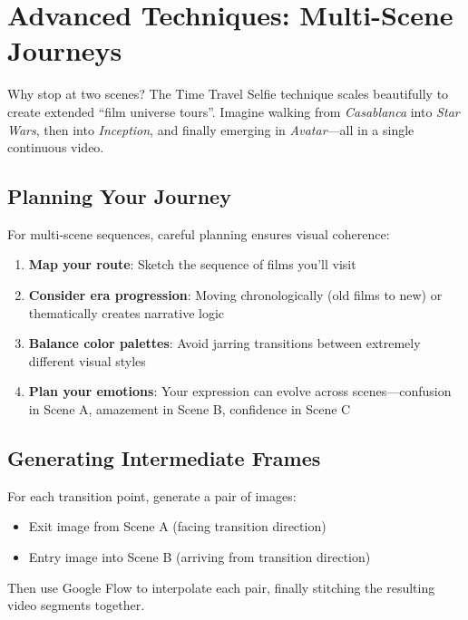 \section{Advanced Techniques: Multi-Scene Journeys}
\label{sec:multi-scene}

Why stop at two scenes? The Time Travel Selfie technique scales beautifully to create extended ``film universe tours''. Imagine walking from \textit{Casablanca} into \textit{Star Wars}, then into \textit{Inception}, and finally emerging in \textit{Avatar}—all in a single continuous video.

\subsection{Planning Your Journey}

For multi-scene sequences, careful planning ensures visual coherence:

\begin{enumerate}
\item \textbf{Map your route}: Sketch the sequence of films you'll visit
\item \textbf{Consider era progression}: Moving chronologically (old films to new) or thematically creates narrative logic
\item \textbf{Balance color palettes}: Avoid jarring transitions between extremely different visual styles
\item \textbf{Plan your emotions}: Your expression can evolve across scenes—confusion in Scene A, amazement in Scene B, confidence in Scene C
\end{enumerate}

\subsection{Generating Intermediate Frames}

For each transition point, generate a pair of images:

\begin{itemize}
\item Exit image from Scene A (facing transition direction)
\item Entry image into Scene B (arriving from transition direction)
\end{itemize}

Then use Google Flow to interpolate each pair, finally stitching the resulting video segments together.

